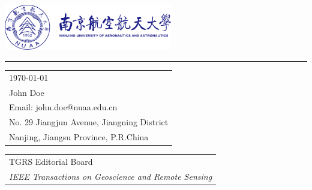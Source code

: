 \documentclass{article}
\begin{document}

\includegraphics[width=0.55\textwidth]{nuaa_logo.pdf} %

\vspace{-1em} %

\rule{\linewidth}{1pt} %

\bigskip\bigskip %


\hfill
\begin{tabular}{l @{}}
\hfill \today \bigskip\\ %
\hfill John Doe \\
\hfill Email: john.doe@nuaa.edu.cn \\
\hfill No. 29 Jiangjun Avenue, Jiangning District\\
\hfill Nanjing, Jiangsu Province, P.R.China \\ %
\end{tabular}


\bigskip %


% 
% 
\begin{tabular}{@{} l}
	TGRS Editorial Board \\
	\textit{IEEE Transactions on Geoscience and Remote Sensing}
\end{tabular}
\end{document}

